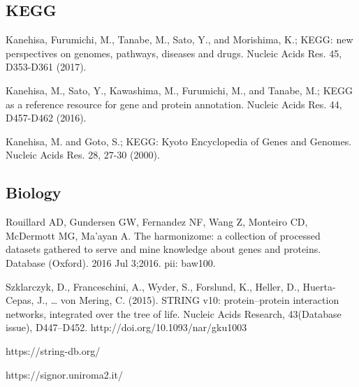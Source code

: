 \subsection{KEGG}

 Kanehisa, Furumichi, M., Tanabe, M., Sato, Y., and Morishima, K.; 
\newblock KEGG: new perspectives on genomes, pathways, diseases and drugs. 
\newblock Nucleic Acids Res. 45, D353-D361 (2017).

 Kanehisa, M., Sato, Y., Kawashima, M., Furumichi, M., and Tanabe, M.; 
\newblock KEGG as a reference resource for gene and protein annotation. 
\newblock Nucleic Acids Res. 44, D457-D462 (2016).

 Kanehisa, M. and Goto, S.; 
\newblock KEGG: Kyoto Encyclopedia of Genes and Genomes. 
\newblock Nucleic Acids Res. 28, 27-30 (2000). 

\subsection{Biology}

 Rouillard AD, Gundersen GW, Fernandez NF, Wang Z, Monteiro CD, McDermott MG, Ma'ayan A. 
\newblock The harmonizome: a collection of processed datasets gathered to serve and mine knowledge about genes and proteins. 
\newblock Database (Oxford). 2016 Jul 3;2016. pii: baw100.

Szklarczyk, D., Franceschini, A., Wyder, S., Forslund, K., Heller, D., Huerta-Cepas, J., … von Mering, C. (2015). 
\newblock STRING v10: protein–protein interaction networks, integrated over the tree of life. 
\newblock Nucleic Acids Research, 43(Database issue), D447–D452. http://doi.org/10.1093/nar/gku1003

 https://string-db.org/

https://signor.uniroma2.it/

